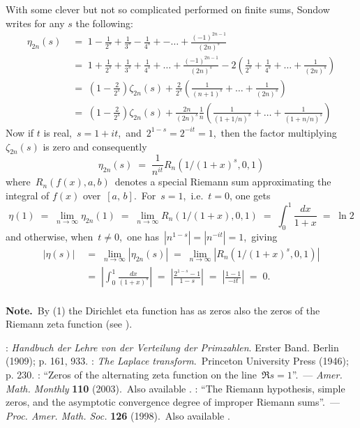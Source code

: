 \documentclass[12pt]{article}
\theoremstyle{definition}
\begin{document}
With some clever but not so complicated  performed on finite sums, Sondow writes for any $s$ the following:
\begin{align*}
\eta_{2n}(s) &\;=\; 1-\frac{1}{2^s}+\frac{1}{3^s}-\frac{1}{4^s}+-\ldots+\frac{(-1)^{2n-1}}{(2n)^s}\\
         &\;=\; 1+\frac{1}{2^s}+\frac{1}{3^s}+\frac{1}{4^s}+\ldots+\frac{(-1)^{2n-1}}{(2n)^s}
-2\left(\frac{1}{2^s}+\frac{1}{4^s}+\ldots+\frac{1}{(2n)^s} \right)\\
         &\;=\; \left(1-\frac{2}{2^s}\right)\zeta_{2n}(s)
+\frac{2}{2^s}\left(\frac{1}{(n\!+\!1)^s}+\ldots+\frac{1}{(2n)^s}\right)\\
         &\;=\; \left(1-\frac{2}{2^s}\right)\zeta_{2n}(s)
+\frac{2n}{(2n)^s}\frac{1}{n}\left(\frac{1}{(1\!+\!1/n)^s}+\ldots+\frac{1}{(1\!+\!n/n)^s}\right)
\end{align*}
Now if $t$ is real,\, $s = 1\!+\!it$,\, and\, $2^{1-s} = 2^{-it} = 1$,\, then the factor multiplying $\zeta_{2n}(s)$ is zero and consequently
$$\eta_{2n}(s) \;=\; \frac{1}{n^{it}}R_n(1/(1\!+\!x)^s,0,1)$$
where\, $R_n(f(x),a,b)$\, denotes a special Riemann sum approximating the integral of $f(x)$ over\, $[a,\,b]$.\, For\, $s = 1$,\, i.e.\, $t = 0$, one gets
$$\eta(1) \;=\; \lim_{n\to\infty}\eta_{2n}(1) \;=\; \lim_{n\to\infty}R_n(1/(1\!+\!x),0,1) 
\;=\; \int_0^1\frac{dx}{1\!+\!x} \;=\; \ln{2}$$
and otherwise, when\, $t \neq 0$,\, one has\, $|n^{1-s}| = |n^{-it}| = 1$,\, giving
\begin{align*}
|\eta(s)| &\;=\; \lim_{n\to\infty}|\eta_{2n}(s)| \;=\; \lim_{n\to\infty}|R_n(1/(1\!+\!x)^s,0,1)|\\
          &\;=\; \left|\int_0^1\frac{dx}{(1\!+\!x)^s}\right| \;=\; \left|\frac{2^{1-s}\!-\!1}{1\!-\!s}\right|
 \;=\; \left|\frac{1\!-\!1}{-it}\right| \;=\; 0.
\end{align*}\\

\textbf{Note.}\, By (1) the Dirichlet eta function has as zeros 
also the zeros of the Riemann zeta function (see 
).

\begin{thebibliography}{8}
: \emph{Handbuch der Lehre von der Verteilung der Primzahlen}. Erster Band. Berlin (1909); p. 161, 933.
: \emph{The Laplace transform}.\, Princeton University Press (1946); p. 230.
: ``Zeros of the alternating zeta function on the line\, $\Re{s} = 1$''.\, --- \emph{Amer. Math. Monthly} \textbf{110} (2003).\, Also available .
: ``The Riemann hypothesis, simple zeros, and the asymptotic convergence degree of improper Riemann sums''.\, --- \emph{Proc. Amer. Math. Soc.} \textbf{126} (1998).\, Also available .
\end{thebibliography}

\end{document}
